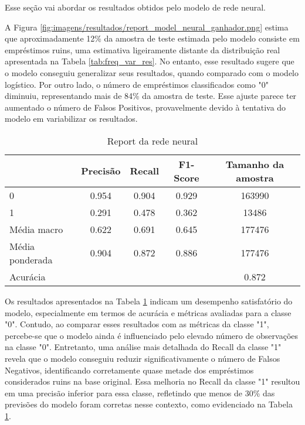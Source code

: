Esse seção vai abordar os resultados obtidos pelo modelo de rede neural.




A Figura \ref{fig:imagens/resultados/report_model_neural_ganhador.png} estima que aproximadamente 
12\% da amostra de teste estimada pelo modelo consiste em empréstimos ruins, uma estimativa ligeiramente distante 
da distribuição real apresentada na Tabela \ref{tab:freq_var_res}. No entanto, esse resultado 
sugere que o modelo conseguiu generalizar seus resultados, quando comparado com o modelo logístico. 
Por outro lado, o número de empréstimos
classificados como "0" diminuiu, representando mais de 84\% da amostra de teste. Esse ajuste 
parece ter aumentado o número de Falsos Positivos, provavelmente devido à tentativa do modelo
em variabilizar os resultados.


\begin{table}[H]
  \centering
\begin{tabular}{lcccc}
  \hline
  &    \textbf{Precisão} & \textbf{Recall}    &   \textbf{F1-Score} &  \textbf{Tamanho da amostra} \\
  \hline
   0                &    0.954 & 0.904 &   0.929 & 163990        \\
   1                &    0.291 & 0.478 &   0.362 & 13486         \\
   Média macro      &    0.622 & 0.691 &   0.645 & 177476        \\
   Média ponderada  &    0.904 & 0.872 &   0.886 & 177476        \\ \hline
   Acurácia         &          &       &         & 0.872      \\
  \hline
\end{tabular}
\caption{Report da rede neural}
\label{tab:report_model_neural_ganhador}
\end{table}


Os resultados apresentados na Tabela \ref{tab:report_model_neural_ganhador} indicam um desempenho satisfatório
do modelo, especialmente em termos de acurácia e métricas avaliadas para a classe "0". 
Contudo, ao comparar esses resultados com as métricas da classe "1", percebe-se que o modelo ainda
é influenciado pelo elevado número de observações na classe "0". Entretanto, uma análise mais detalhada 
do Recall da classe "1" revela que o modelo conseguiu reduzir significativamente o número de Falsos Negativos,
identificando corretamente quase metade dos empréstimos considerados ruins na base original. Essa melhoria 
no Recall da classe "1" resultou em uma precisão inferior para essa classe, refletindo que menos de 30\% 
das previsões do modelo foram corretas nesse contexto, como evidenciado na Tabela \ref{tab:report_model_neural_ganhador}.


